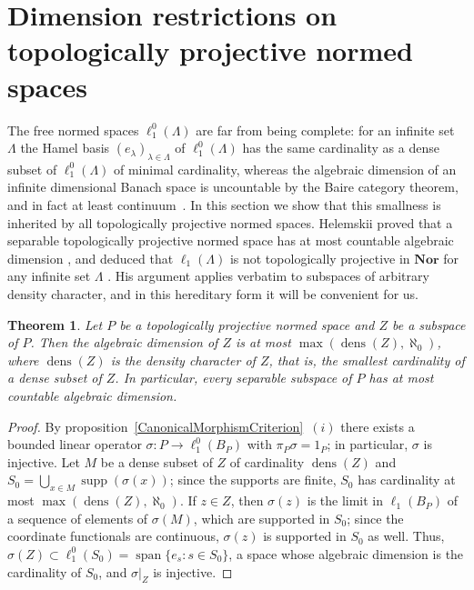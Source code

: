 \documentclass[12pt]{article}
\newtheorem{theorem}{Theorem}[section]
\newcommand{\Nor}{\mathbf{Nor}}
\newcommand{\lo}[1]{\ell_1^0(#1)}
\newcommand{\ellone}[1]{\ell_1(#1)}
\newcommand{\supp}{\operatorname{supp}}
\newcommand{\Lin}{\operatorname{span}}
\begin{document}

\section{Dimension restrictions on topologically projective normed
  spaces}\label{SectionNecessaryConditions}

The free normed spaces $\lo{\Lambda}$ are far from being complete: for an
infinite set $\Lambda$ the Hamel basis ${(e_\lambda)}_{\lambda\in\Lambda}$ of
$\lo{\Lambda}$ has the same cardinality as a dense subset of $\lo{\Lambda}$
of minimal cardinality, whereas the algebraic dimension of an infinite
dimensional Banach space is uncountable by the Baire category theorem, and in
fact at least continuum~\cite{LowigDimLinRaume}. In this section we show that
this smallness is inherited by all topologically projective normed spaces.
Helemskii proved that a separable topologically projective normed space has at
most countable algebraic dimension \cite[proposition 2.4]{HelExtrProjSeqAlg},
and deduced that $\ellone{\Lambda}$ is not topologically projective in $\Nor$
for any infinite set $\Lambda$ \cite[proposition 2.5]{HelExtrProjSeqAlg}. His
argument applies verbatim to subspaces of arbitrary density character, and in
this hereditary form it will be convenient for us.

\begin{theorem}\label{SeparableSubspaces} Let $P$ be a topologically
    projective normed space and $Z$ be a subspace of $P$. Then the algebraic
    dimension of $Z$ is at most $\max(\operatorname{dens}(Z),\aleph_0)$,
    where $\operatorname{dens}(Z)$ is the density character of $Z$, that is,
    the smallest cardinality of a dense subset of $Z$. In particular, every
    separable subspace of $P$ has at most countable algebraic dimension.
\end{theorem}
\begin{proof} By proposition~\ref{CanonicalMorphismCriterion}~$(i)$ there
    exists a bounded linear operator $\sigma:P\to\lo{B_P}$ with
    $\pi_P\sigma=1_P$; in particular, $\sigma$ is injective. Let $M$ be a
    dense subset of $Z$ of cardinality $\operatorname{dens}(Z)$ and
    $S_0=\bigcup_{x\in M}\supp(\sigma(x))$; since the supports are finite,
    $S_0$ has cardinality at most $\max(\operatorname{dens}(Z),\aleph_0)$. If
    $z\in Z$, then $\sigma(z)$ is the limit in $\ellone{B_P}$ of a sequence of
    elements of $\sigma(M)$, which are supported in $S_0$; since the coordinate
    functionals are continuous, $\sigma(z)$ is supported in $S_0$ as well.
    Thus, $\sigma(Z)\subset\lo{S_0}=\Lin\{e_s:s\in S_0\}$, a space whose
    algebraic dimension is the cardinality of $S_0$, and $\sigma|_Z$ is
    injective.
\end{proof}
\end{document}
